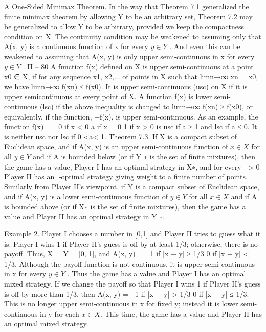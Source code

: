 \documentclass[]{report}
\begin{document}
A One-Sided Minimax Theorem. In the way that Theorem 7.1 generalized the
finite minimax theorem by allowing Y to be an arbitrary set, Theorem 7.2 may be generalized
to allow Y to be arbitrary, provided we keep the compactness condition on X.
The continuity condition may be weakened to assuming only that A(x, y) is a continuous
function of x for every $y \in Y$ . And even this can be weakened to assuming that A(x, y) is
only upper semi-continuous in x for every $y \in Y$ .
II – 80
A function f(x) defined on X is upper semi-continuous at a point x0 ∈ X, if for any
sequence x1, x2,... of points in X such that limn→∞ xn = x0, we have limn→∞ f(xn) ≤
f(x0). It is upper semi-continuous (usc) on X if it is upper semicontinuous at every point
of X. A function f(x) is lower semi-continuous (lsc) if the above inequality is changed to
limn→∞ f(xn) ≥ f(x0), or equivalently, if the function, −f(x), is upper semi-continuous.
As an example, the function
f(x) =  0 if x < 0
a if x = 0
1 if x > 0
is usc if a ≥ 1 and lsc if a ≤ 0. It is neither usc nor lsc if 0 <a< 1.
Theorem 7.3. If X is a compact subset of Euclidean space, and if A(x, y) is an upper
semi-continuous function of $x \in X$ for all $y \in Y$ and if A is bounded below (or if Y ∗ is the
set of finite mixtures), then the game has a value, Player I has an optimal strategy in X∗,
and for every  > 0 Player II has an -optimal strategy giving weight to a finite number of
points.
Similarly from Player II’s viewpoint, if Y is a compact subset of Euclidean space, and
if A(x, y) is a lower semi-continuous function of $y \in Y$ for all $x \in X$ and if A is bounded
above (or if X∗ is the set of finite mixtures), then the game has a value and Player II has
an optimal strategy in Y ∗.

Example 2. Player I chooses a number in [0,1] and Player II tries to guess what it
is. Player I wins 1 if Player II’s guess is off by at least 1/3; otherwise, there is no payoff.
Thus, X = Y = [0, 1], and A(x, y) =  1 if |x − y| ≥ 1/3
0 if |x − y| < 1/3. Although the payoff
function is not continuous, it is upper semi-continuous in x for every $y \in Y$ . Thus the
game has a value and Player I has an optimal mixed strategy.
If we change the payoff so that Player I wins 1 if Player II’s guess is off by more than
1/3, then A(x, y) =  1 if |x − y| > 1/3
0 if |x − y| ≤ 1/3. This is no longer upper semi-continuous in x
for fixed y; instead it is lower semi-continuous in y for each $x \in X$. This time, the game
has a value and Player II has an optimal mixed strategy.
\end{document}
